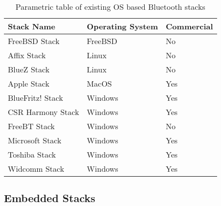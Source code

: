 \begin{table}[H]
	\begin{center}
		\begin{tabular}{ | l | l | l |}
			\hline
			\textbf{Stack Name}	& \textbf{Operating System}	& \textbf{Commercial} \\ \hline

			FreeBSD Stack		& FreeBSD	& No	\\ \hline
			Affix Stack			& Linux		& No	\\ \hline
			BlueZ Stack			& Linux		& No	\\ \hline
			Apple Stack			& MacOS		& Yes	\\ \hline
			BlueFritz! Stack	& Windows	& Yes	\\ \hline
			CSR Harmony Stack	& Windows	& Yes	\\ \hline
			FreeBT Stack 		& Windows	& No	\\ \hline
			Microsoft Stack		& Windows	& Yes	\\ \hline
			Toshiba Stack		& Windows	& Yes	\\ \hline
			Widcomm Stack		& Windows	& Yes	\\ \hline
			\hline
		\end{tabular}
		\caption[Existing Operating System Bluetooth Stacks]{Parametric table of existing OS based Bluetooth stacks}
		\label{tab:osbtstacks}
	\end{center}
\end{table}


\subsection{Embedded Stacks}

